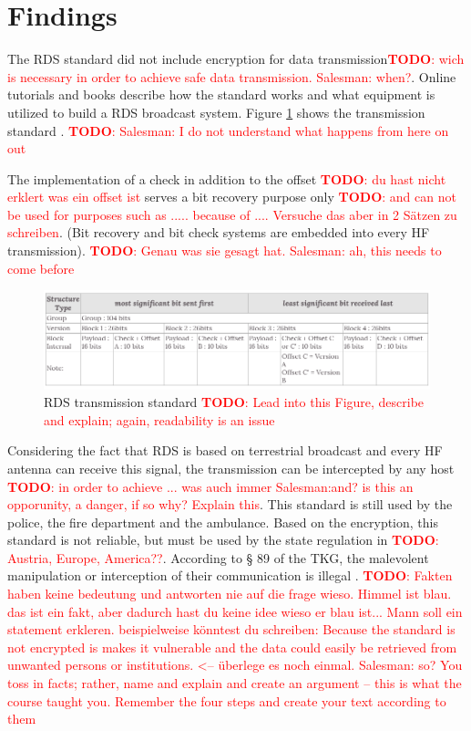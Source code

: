 \documentclass[conference,11pt,a4paper]{IEEEtran}
\newcommand{\todo}[1]{\textcolor{red}{\textbf{TODO}: #1}}
\begin{document}
	\section{Findings}
	
	The RDS standard did not include encryption for data transmission\todo{wich is necessary in order to achieve safe data transmission. Salesman: when?}. Online tutorials and books describe how the standard works and what equipment is utilized to build a RDS broadcast system. Figure \ref{fig: standard} shows the transmission standard \cite{DIN_EN}. \todo{Salesman: I do not understand what happens from here on out }
	
	
	The implementation of a check in addition to the offset \todo{du hast nicht erklert was ein offset ist} serves a bit recovery purpose only \todo{and can not be used for purposes such as ..... because of .... Versuche das aber in 2 Sätzen zu schreiben}. (Bit recovery and bit check systems are embedded into every HF transmission). \todo{Genau was sie gesagt hat. Salesman: ah, this needs to come before}
	
	\begin{figure}[h]
		\centering
		\includegraphics[scale=0.265]{img/standard}
		\caption{RDS transmission standard \todo{Lead into this Figure, describe and explain; again, readability is an issue}}
		\label{fig: standard}
	\end{figure}
	
	Considering the fact that RDS is based on terrestrial broadcast and every HF antenna can receive this signal, the transmission can be intercepted by any host \todo{in order to achieve ... was auch immer Salesman:and? is this an opporunity, a danger, if so why? Explain this}. This standard is still used by the police, the fire department and the ambulance.  Based on the encryption, this standard is not reliable, but must be used by the state regulation in \todo{Austria, Europe, America??}. According to § 89 of the TKG, the malevolent manipulation or interception of their communication is illegal \cite{telecomGesetz}. \todo{Fakten haben keine bedeutung und antworten nie auf die frage wieso. Himmel ist blau. das ist ein fakt, aber dadurch hast du keine idee wieso er blau ist... Mann soll ein statement erkleren. beispielweise könntest du schreiben: Because the standard is not encrypted is makes it vulnerable and the data could easily be retrieved from unwanted persons or institutions. <-- überlege es noch einmal. Salesman: so? You toss in facts; rather, name and explain and create an argument – this is what the course taught you. Remember the four steps and create your text according to them}\\
	
\end{document}
